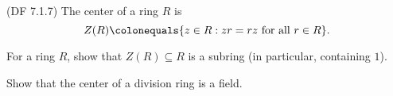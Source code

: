 \begin{problem}{(\textsf{DF 7.1.7})}
  The \textsf{center} of a ring $R$ is 
  \[ Z(R) \colonequals \{z \in R : zr=rz \text{ for all $r \in R$}\}. \]
  \begin{enumalph}
    \item For a ring $R$, show that $Z(R) \subseteq R$ is a subring (in particular, 
    containing $1$).  
    \item Show that the center of a division ring is a field.
  \end{enumalph}
\end{problem}
